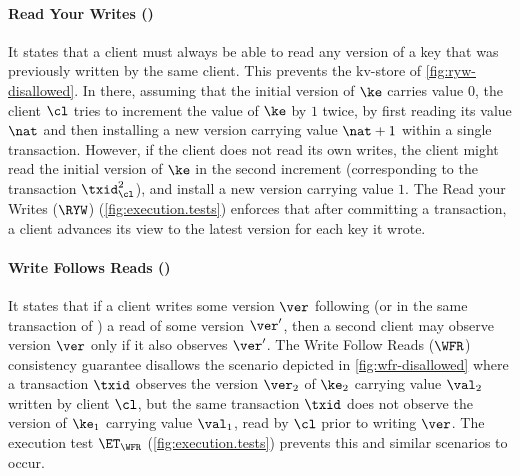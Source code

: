 \paragraph{Read Your Writes (\RYW)}
It states that a client must always be able to read any version 
of a key that was previously written by the same client. This prevents the kv-store of \cref{fig:ryw-disallowed}. 
In there, assuming that the initial version of $\ke$ carries value $0$, the client $\cl$ tries to increment the value of $\ke$ by $1$ twice, 
by first reading its value $\nat$ and then installing a new version carrying  value $\nat+1$ within a single transaction.
However, if the client does not read its 
own writes, the client might read the initial version of $\ke$ in the second increment 
(corresponding to the transaction $\txid_{\cl}^2$), and install a new version carrying value $1$.
The Read your Writes ($\RYW$) (\cref{fig:execution.tests}) enforces that after committing a transaction, 
a client advances its view to the latest version for each key it wrote.  

\paragraph{Write Follows Reads (\WFR)}
It states that if a client writes some version $\ver$ following (or in the same transaction of ) 
a read of some version $\ver'$, 
then a second client may observe version $\ver$ only if it also observes $\ver'$. The Write Follow Reads ($\WFR$) 
consistency guarantee disallows the scenario depicted in  \cref{fig:wfr-disallowed} 
where a transaction $\txid$ observes the version $\ver_2$ of $\ke_2$ carrying value $\val_2$ written by client $\cl$,
but the same transaction $\txid$ does not observe 
the version of $\ke_1$ carrying value $\val_1$, read by $\cl$ prior to writing $\ver$. 
The execution test $\ET_{\WFR}$ (\cref{fig:execution.tests}) prevents this and similar scenarios to occur.

